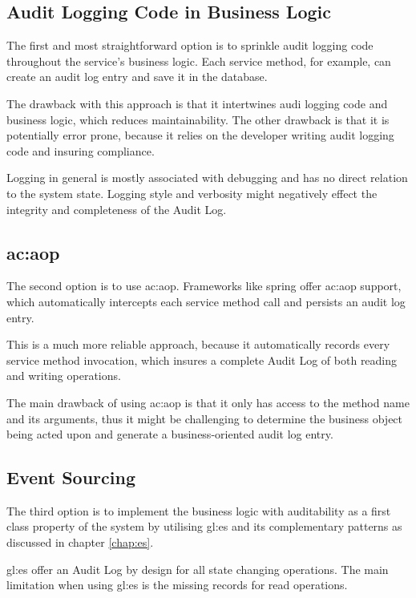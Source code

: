 \subsection{Audit Logging Code in Business Logic}

The first and most straightforward option is to sprinkle audit logging code throughout the service’s business logic. Each service method, for example, can create an audit log entry and save it in the database. 

The drawback with this approach is that it intertwines audi logging code and business logic, which reduces maintainability.
The other drawback is that it is potentially error prone, because it relies on the developer writing audit logging code and insuring compliance.

Logging in general is mostly associated with debugging and has no direct relation to the system state. Logging style and verbosity might negatively effect the integrity and completeness of the Audit Log.

\subsection{\acrlong{ac:aop}}

The second option is to use \gls{ac:aop}. Frameworks like spring offer \gls{ac:aop} support, which automatically intercepts each service method call and persists an audit log entry.

This is a much more reliable approach, because it automatically records every service method invocation, which insures a complete Audit Log of both reading and writing operations.

The main drawback of using \gls{ac:aop} is that it only has access to the method name and its arguments, thus it might be challenging to determine the business object being acted upon and generate a business-oriented audit log entry.

\subsection{Event Sourcing}\label{sec:saes}

The third option is to implement the business logic with auditability as a first class property of the system by utilising \gls{gl:es} and its complementary patterns as discussed in chapter \ref{chap:es}. 

\gls{gl:es} offer an Audit Log by design for all state changing operations. The main limitation when using \gls{gl:es} is the missing records for read operations.

